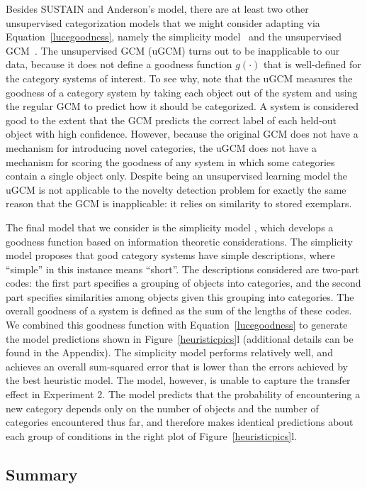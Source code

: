 \documentclass[doc]{apa6}
\begin{document}
Besides SUSTAIN and Anderson's model, there are at least two other unsupervised categorization models that we might consider adapting via Equation~\ref{lucegoodness}, namely the simplicity model~\cite{pothos_simplicity_2002} and the unsupervised GCM~\cite{pothos_predicting_2009}. The unsupervised GCM (uGCM) turns out to be inapplicable to our data, because it does not define a goodness function $g(\cdot)$ that is well-defined for the category systems of interest. To see why, note that the uGCM measures the goodness of a category system by taking each object out of the system and using the regular GCM to predict how it should be categorized. A system is considered good to the extent that the GCM predicts the correct label of each held-out object with high confidence. However, because the original GCM does not have a mechanism for introducing novel categories, the uGCM does not have a mechanism for scoring the goodness of any system in which some categories contain a single object only. Despite being an unsupervised learning model the uGCM is not applicable to the novelty detection problem for exactly the same reason that the GCM is inapplicable: it relies on similarity to stored exemplars.

The final model that we consider is the simplicity model \cite{pothos_simplicity_2002}, which develops a goodness function based on information theoretic considerations. The simplicity model proposes that good category systems have simple descriptions, where ``simple'' in this instance means ``short''. The descriptions considered are two-part codes: the first part specifies a grouping of objects into categories, and the second part specifies similarities among objects given this grouping into categories. The overall goodness of a system is defined as the sum of the lengths of these codes. We combined this goodness function with Equation~\ref{lucegoodness} to generate the model predictions shown in Figure~\ref{heuristicpics}l (additional details can be found in the Appendix). The simplicity model performs relatively well, and achieves an overall sum-squared error that is lower than the errors achieved by the best heuristic model. The model, however, is unable to capture the transfer effect in Experiment 2.  The model predicts that the probability of encountering a new category depends only on the number of objects and the number of categories encountered thus far, and therefore makes identical predictions about each group of conditions in the right plot of Figure~\ref{heuristicpics}l.


\subsection{Summary}
\end{document}
